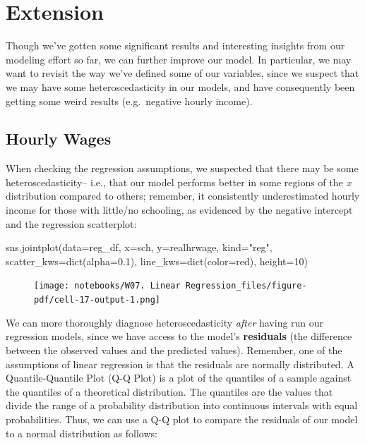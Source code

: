 \documentclass[
  letterpaper,
  DIV=11,
  numbers=noendperiod]{scrreprt}
\newenvironment{Shaded}{\begin{snugshade}}{\end{snugshade}}
\newcommand{\BuiltInTok}[1]{\textcolor[rgb]{0.00,0.23,0.31}{#1}}
\newcommand{\DecValTok}[1]{\textcolor[rgb]{0.68,0.00,0.00}{#1}}
\newcommand{\FloatTok}[1]{\textcolor[rgb]{0.68,0.00,0.00}{#1}}
\newcommand{\NormalTok}[1]{\textcolor[rgb]{0.00,0.23,0.31}{#1}}
\newcommand{\OperatorTok}[1]{\textcolor[rgb]{0.37,0.37,0.37}{#1}}
\newcommand{\StringTok}[1]{\textcolor[rgb]{0.13,0.47,0.30}{#1}}
\begin{document}
\hypertarget{extension-2}{%
\section{Extension}\label{extension-2}}

Though we've gotten some significant results and interesting insights
from our modeling effort so far, we can further improve our model. In
particular, we may want to revisit the way we've defined some of our
variables, since we suspect that we may have some heteroscedasticity in
our models, and have consequently been getting some weird results
(e.g.~negative hourly income).

\hypertarget{hourly-wages}{%
\subsection{Hourly Wages}\label{hourly-wages}}

When checking the regression assumptions, we suspected that there may be
some heteroscedasticity-- i.e., that our model performs better in some
regions of the \(x\) distribution compared to others; remember, it
consistently underestimated hourly income for those with little/no
schooling, as evidenced by the negative intercept and the regression
scatterplot:

\begin{Shaded}
\begin{Highlighting}[]
\NormalTok{sns.jointplot(data}\OperatorTok{=}\NormalTok{reg\_df, x}\OperatorTok{=}\StringTok{\textquotesingle{}sch\textquotesingle{}}\NormalTok{, y}\OperatorTok{=}\StringTok{\textquotesingle{}realhrwage\textquotesingle{}}\NormalTok{, kind}\OperatorTok{=}\StringTok{"reg"}\NormalTok{,  scatter\_kws}\OperatorTok{=}\BuiltInTok{dict}\NormalTok{(alpha}\OperatorTok{=}\FloatTok{0.1}\NormalTok{), line\_kws}\OperatorTok{=}\BuiltInTok{dict}\NormalTok{(color}\OperatorTok{=}\StringTok{\textquotesingle{}red\textquotesingle{}}\NormalTok{), height}\OperatorTok{=}\DecValTok{10}\NormalTok{)}
\end{Highlighting}
\end{Shaded}

\begin{figure}[H]

{\centering \texttt{[image: notebooks/W07. Linear Regression\_files/figure-pdf/cell-17-output-1.png]}

}

\end{figure}

We can more thoroughly diagnose heteroscedasticity \emph{after} having
run our regression models, since we have access to the model's
\textbf{residuals} (the difference between the observed values and the
predicted values). Remember, one of the assumptions of linear regression
is that the residuals are normally distributed. A Quantile-Quantile Plot
(Q-Q Plot) is a plot of the quantiles of a sample against the quantiles
of a theoretical distribution. The quantiles are the values that divide
the range of a probability distribution into continuous intervals with
equal probabilities. Thus, we can use a Q-Q plot to compare the
residuals of our model to a normal distribution as follows:
\end{document}
